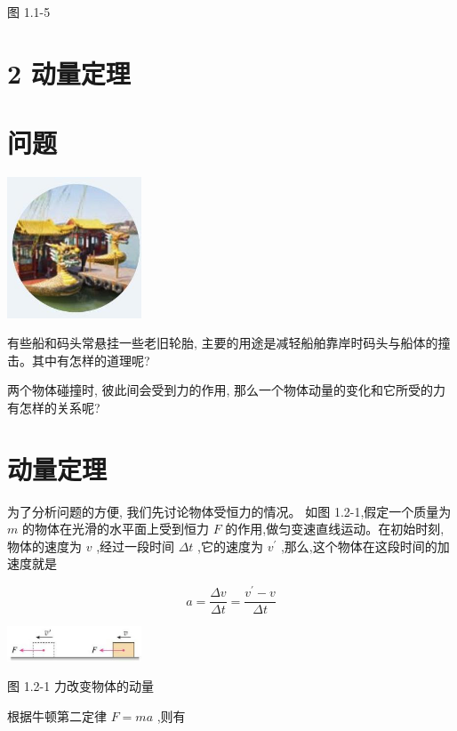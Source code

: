 \documentclass[10pt]{article}
\begin{document}
图 1.1-5

\section*{2 动量定理}

\section*{问题}

\begin{center}
\includegraphics[max width=0.3\textwidth]{images/01910e4c-ebb8-7d2c-8f2f-2375bc1d2d12_11_150618.jpg}
\end{center}

有些船和码头常悬挂一些老旧轮胎, 主要的用途是减轻船舶靠岸时码头与船体的撞击。其中有怎样的道理呢?

两个物体碰撞时, 彼此间会受到力的作用, 那么一个物体动量的变化和它所受的力有怎样的关系呢?

\section*{动量定理}

为了分析问题的方便, 我们先讨论物体受恒力的情况。 如图 1.2-1,假定一个质量为 \(m\) 的物体在光滑的水平面上受到恒力 \(F\) 的作用,做匀变速直线运动。在初始时刻,物体的速度为 \(v\) ,经过一段时间 \({\Delta t}\) ,它的速度为 \({v}^{\prime }\) ,那么,这个物体在这段时间的加速度就是

\[
a = \frac{\Delta v}{\Delta t} = \frac{{v}^{\prime } - v}{\Delta t}
\]

\begin{center}
\includegraphics[max width=0.3\textwidth]{images/01910e4c-ebb8-7d2c-8f2f-2375bc1d2d12_11_774042.jpg}
\end{center}

图 1.2-1 力改变物体的动量

根据牛顿第二定律 \(F = {ma}\) ,则有
\end{document}
